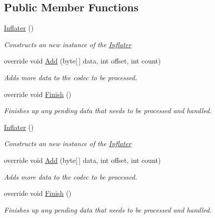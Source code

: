 \subsection*{Public Member Functions}
\begin{DoxyCompactItemize}
\item 
\hyperlink{class_dot_z_lib_1_1_inflater_acb40e9664a78756a3def8ed66aa35ca1}{Inflater} ()
\begin{DoxyCompactList}\small\item\em Constructs an new instance of the {\ttfamily \hyperlink{class_dot_z_lib_1_1_inflater}{Inflater}} \end{DoxyCompactList}\item 
override void \hyperlink{class_dot_z_lib_1_1_inflater_a773dd62fe806dd9b6117f859faaeb079}{Add} (byte\mbox{[}$\,$\mbox{]} data, int offset, int count)
\begin{DoxyCompactList}\small\item\em Adds more data to the codec to be processed. \end{DoxyCompactList}\item 
override void \hyperlink{class_dot_z_lib_1_1_inflater_aa70c9d026f5d1b44fe0679b78973285c}{Finish} ()
\begin{DoxyCompactList}\small\item\em Finishes up any pending data that needs to be processed and handled. \end{DoxyCompactList}\item 
\hyperlink{class_dot_z_lib_1_1_inflater_acb40e9664a78756a3def8ed66aa35ca1}{Inflater} ()
\begin{DoxyCompactList}\small\item\em Constructs an new instance of the {\ttfamily \hyperlink{class_dot_z_lib_1_1_inflater}{Inflater}} \end{DoxyCompactList}\item 
override void \hyperlink{class_dot_z_lib_1_1_inflater_a773dd62fe806dd9b6117f859faaeb079}{Add} (byte\mbox{[}$\,$\mbox{]} data, int offset, int count)
\begin{DoxyCompactList}\small\item\em Adds more data to the codec to be processed. \end{DoxyCompactList}\item 
override void \hyperlink{class_dot_z_lib_1_1_inflater_aa70c9d026f5d1b44fe0679b78973285c}{Finish} ()
\begin{DoxyCompactList}\small\item\em Finishes up any pending data that needs to be processed and handled. \end{DoxyCompactList}\end{DoxyCompactItemize}
